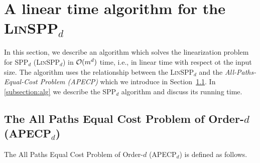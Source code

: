 \section{A linear time algorithm for the \textsc{Lin}SPP$_d$}\label{algo:sec}
In this section, we describe an algorithm which solves the linearization problem for SPP$_d$ (\textsc{Lin}SPP$_d$) in  $\mathcal{O}(m^d)$ time, i.e., in linear time with respect ot the input size.
The algorithm uses the relationship between the \textsc{Lin}SPP$_d$ and the  \emph{All-Paths-Equal-Cost Problem (APECP)} which we introduce in  Section~\ref{APEC:ssec}.  
In \cref{subsection:alg} we describe the SPP$_d$ algorithm and discuss
its running time.

 \subsection{The All Paths Equal Cost Problem of Order-$d$ (APECP$_d$)}
\label{APEC:ssec}

The All Paths  Equal Cost Problem of Order-$d$ (APECP$_d$) is defined as follows.
\begin{center}
\end{center}

